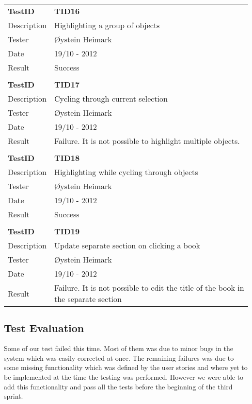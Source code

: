 \begin{table}
\begin{tabular}{ l p{13cm} }
\bf{TestID}		&\bf{TID16}			\\
Description	&Highlighting a group of objects\\
Tester		&Øystein Heimark	\\
Date			&19/10 - 2012	\\
Result		&Success			\\
\hline \\ [-2.0ex]

\bf{TestID}		&\bf{TID17}			\\
Description	&Cycling through current selection	\\
Tester		&Øystein Heimark	\\
Date			&19/10 - 2012	\\
Result		&Failure. It is not possible to highlight multiple objects.		\\
\hline \\ [-2.0ex]

\bf{TestID}		&\bf{TID18}			\\
Description	&Highlighting while cycling through objects	\\
Tester		&Øystein Heimark	\\
Date			&19/10 - 2012	\\
Result		&Success	\\
\hline \\ [-2.0ex]

\bf{TestID}		&\bf{TID19}			\\
Description	&Update separate section on clicking a book	\\
Tester		&Øystein Heimark	\\
Date			&19/10 - 2012	\\
Result		&Failure. It is not possible to edit the title of the book in the separate section		\\
\hline

\end{tabular}
\label{table:sp2testresults}
\end{table}

\subsection{Test Evaluation}
Some of our test failed this time. Most of them was due to minor bugs in the system which was easily corrected at once. The remaining failures was due to some missing functionality which was defined by the user stories and where yet to be implemented at the time the testing was performed. However we were able to add this functionality and pass all the tests before the beginning of the third sprint.

